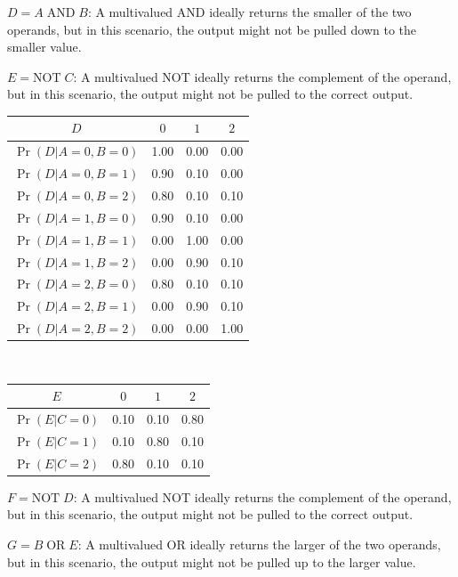 \documentclass{article}
\begin{document}
\vspace{5mm}

\(D = A \;\text{AND}\; B\): A multivalued AND ideally returns the smaller of the two operands, but in this scenario, the output might not be pulled down to the smaller value. 

\(E = \text{NOT}\; C\): A multivalued NOT ideally returns the complement of the operand, but in this scenario, the output might not be pulled to the correct output.  

\begin{tabular}{|c||c|c|c|}
\hline
\(D\) & \(0\) & \(1\) & \(2\) \\ 
\hline
\hline
\(\Pr(D|A=0,B=0)\) & 1.00 & 0.00 & 0.00 \\
\hline
\(\Pr(D|A=0,B=1)\) & 0.90 & 0.10 & 0.00 \\
\hline
\(\Pr(D|A=0,B=2)\) & 0.80 & 0.10 & 0.10 \\
\hline
\(\Pr(D|A=1,B=0)\) & 0.90 & 0.10 & 0.00 \\
\hline
\(\Pr(D|A=1,B=1)\) & 0.00 & 1.00 & 0.00 \\
\hline
\(\Pr(D|A=1,B=2)\) & 0.00 & 0.90 & 0.10 \\
\hline
\(\Pr(D|A=2,B=0)\) & 0.80 & 0.10 & 0.10 \\
\hline
\(\Pr(D|A=2,B=1)\) & 0.00 & 0.90 & 0.10 \\
\hline
\(\Pr(D|A=2,B=2)\) & 0.00 & 0.00 & 1.00 \\
\hline
\end{tabular}
~
\begin{tabular}{|c||c|c|c|}
\hline
\(E\) & \(0\) & \(1\) & \(2\) \\
\hline
\hline
\(\Pr(E|C=0)\) & 0.10 & 0.10 & 0.80 \\ 
\hline
\(\Pr(E|C=1)\) & 0.10 & 0.80 & 0.10 \\ 
\hline
\(\Pr(E|C=2)\) & 0.80 & 0.10 & 0.10 \\ 
\hline
\end{tabular}

\vspace{5mm}

\(F = \text{NOT}\; D\): A multivalued NOT ideally returns the complement of the operand, but in this scenario, the output might not be pulled to the correct output.  

\(G = B \;\text{OR}\; E\): A multivalued OR ideally returns the larger of the two operands, but in this scenario, the output might not be pulled up to the larger value.
\end{document}
